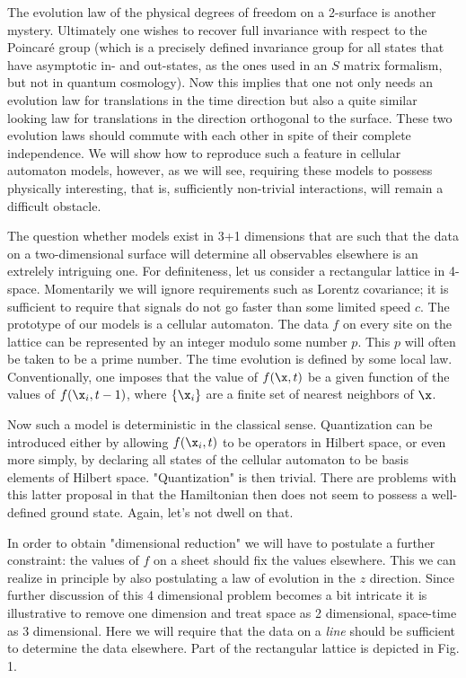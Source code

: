 The evolution law of the physical degrees of freedom on a 2-surface is
another mystery. Ultimately one wishes to recover full invariance with
respect to the Poincar\'e group (which is a precisely defined
invariance group for all states that have asymptotic in- and
out-states, as the ones used in an $S$ matrix formalism, but not in
quantum cosmology). Now this implies that one not only needs an
evolution law for translations in the time direction but also a quite
similar looking law for translations in the direction orthogonal to the
surface. These two evolution laws should commute with each other in
spite of their complete independence. We will show how to reproduce
such a feature in cellular automaton models, however, as we will see,
requiring these models to possess physically interesting, that is,
sufficiently non-trivial interactions, will remain a difficult
obstacle.

The question whether models exist in 3+1 dimensions that are such that
the data on a two-dimensional surface will determine all observables
elsewhere is an extrelely intriguing one. For definiteness, let us
consider a rectangular lattice in 4-space. Momentarily we will ignore
requirements such as Lorentz covariance; it is sufficient to require
that signals do not go faster than some limited speed $c$. The
prototype of our models is a cellular automaton. The data $f$ on
every site on the lattice can be represented by an integer modulo some
number $p$. This $p$ will often be taken to be a prime number. The time
evolution is defined by some local law. Conventionally, one imposes
that the value of $f(\x,t)$ be a given function of the values of
$f(\x_i,t-1)$, where $\{\x_i\}$ are a finite set of nearest neighbors
of $\x$.

Now such a model is deterministic in the classical sense. Quantization
can be introduced either by allowing $f(\x_i,t)$ to be operators in
Hilbert space, or even more simply, by declaring all states of the
cellular automaton to be basis elements of Hilbert space.
"Quantization" is then trivial. There are problems with this latter
proposal in that the Hamiltonian then does not seem to possess a
well-defined ground state. Again, let's not dwell on that.

In order to obtain "dimensional reduction" we will have to postulate a
further constraint: the values of $f$ on a sheet should fix the values
elsewhere.  This we can realize in principle by also postulating a law
of evolution in the $z$ direction. Since further discussion of this 4
dimensional problem becomes a bit intricate it is illustrative to
remove one dimension and treat space as 2 dimensional, space-time as 3
dimensional. Here we will require that the data on a {\it line} should
be sufficient to determine the data elsewhere. Part of the rectangular
lattice is depicted in Fig. 1.

